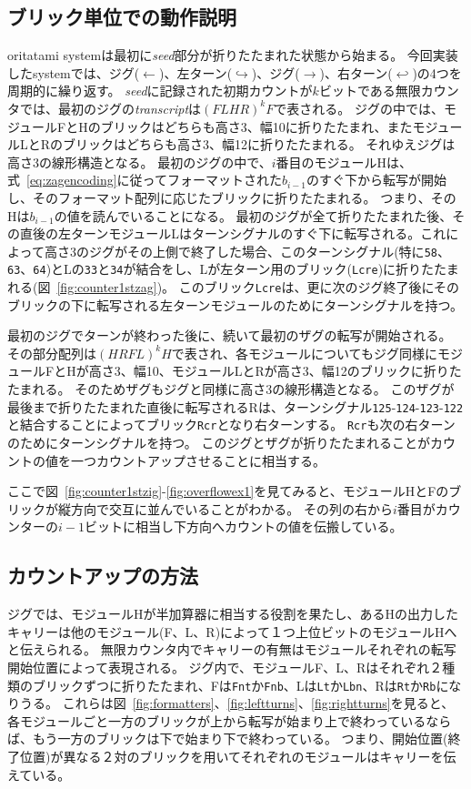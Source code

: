 \documentclass[a4j,11pt]{article}
\begin{document}
\subsection{ブリック単位での動作説明}
oritatami systemは最初に\textit{seed}部分が折りたたまれた状態から始まる。
今回実装したsystemでは、ジグ($\leftarrow$)、左ターン($\hookrightarrow$)、ジグ($\rightarrow$)、右ターン($\hookleftarrow$)の4つを周期的に繰り返す。
\textit{seed}に記録された初期カウントが$k$ビットである無限カウンタでは、最初のジグの\textit{transcript}は$(FLHR)^k F$で表される。
ジグの中では、モジュールFとHのブリックはどちらも高さ3、幅10に折りたたまれ、またモジュールLとRのブリックはどちらも高さ3、幅12に折りたたまれる。
それゆえジグは高さ3の線形構造となる。
最初のジグの中で、$i$番目のモジュールHは、式~\ref{eq:zagencoding}に従ってフォーマットされた$b_{i-1}$のすぐ下から転写が開始し、そのフォーマット配列に応じたブリックに折りたたまれる。
つまり、そのHは$b_{i-1}$の値を読んでいることになる。
最初のジグが全て折りたたまれた後、その直後の左ターンモジュールLはターンシグナルのすぐ下に転写される。これによって高さ3のジグがその上側で終了した場合、このターンシグナル(特に\texttt{58}、\texttt{63}、\texttt{64})とLの\texttt{33}と\texttt{34}が結合をし、Lが左ターン用のブリック(\texttt{Lcre})に折りたたまれる(図~\ref{fig:counter1stzag})。
このブリック\texttt{Lcre}は、更に次のジグ終了後にそのブリックの下に転写される左ターンモジュールのためにターンシグナルを持つ。

最初のジグでターンが終わった後に、続いて最初のザグの転写が開始される。
その部分配列は$(HRFL)^k H$で表され、各モジュールについてもジグ同様にモジュールFとHが高さ3、幅10、モジュールLとRが高さ3、幅12のブリックに折りたたまれる。
そのためザグもジグと同様に高さ3の線形構造となる。
このザグが最後まで折りたたまれた直後に転写されるRは、ターンシグナル\texttt{125}-\texttt{124}-\texttt{123}-\texttt{122}と結合することによってブリック\texttt{Rcr}となり右ターンする。
\texttt{Rcr}も次の右ターンのためにターンシグナルを持つ。
このジグとザグが折りたたまれることがカウントの値を一つカウントアップさせることに相当する。

ここで図~\ref{fig:counter1stzig}-\ref{fig:overflowex1}を見てみると、モジュールHとFのブリックが縦方向で交互に並んでいることがわかる。
その列の右から$i$番目がカウンターの$i{-}1$ビットに相当し下方向へカウントの値を伝搬している。


\subsection{カウントアップの方法}
ジグでは、モジュールHが半加算器に相当する役割を果たし、あるHの出力したキャリーは他のモジュール(F、L、R)によって１つ上位ビットのモジュールHへと伝えられる。
無限カウンタ内でキャリーの有無はモジュールそれぞれの転写開始位置によって表現される。
ジグ内で、モジュールF、L、Rはそれぞれ２種類のブリックずつに折りたたまれ、Fは\texttt{Fnt}か\texttt{Fnb}、Lは\texttt{Lt}か\texttt{Lbn}、Rは\texttt{Rt}か\texttt{Rb}になりうる。
これらは図~\ref{fig:formatters}、\ref{fig:leftturns}、\ref{fig:rightturns}を見ると、各モジュールごと一方のブリックが上から転写が始まり上で終わっているならば、もう一方のブリックは下で始まり下で終わっている。
つまり、開始位置(終了位置)が異なる２対のブリックを用いてそれぞれのモジュールはキャリーを伝えている。
\end{document}
